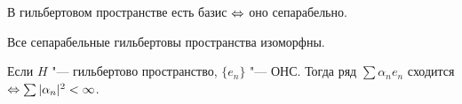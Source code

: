 \documentclass[main]{subfiles}
\begin{document}
\begin{theorem*}
  В гильбертовом пространстве есть базис \( \Leftrightarrow \) оно сепарабельно.
\end{theorem*}

\begin{theorem*}
  Все сепарабельные гильбертовы пространства изоморфны.
\end{theorem*}

\begin{theorem*}
  Если \( H \) "--- гильбертово пространство, \( \{ e_n \} \) "--- ОНС.
  Тогда ряд \( \sum \alpha_n e_n \) сходится \( \Leftrightarrow  \sum |\alpha_n|^2 < \infty \).
\end{theorem*}
\end{document}
